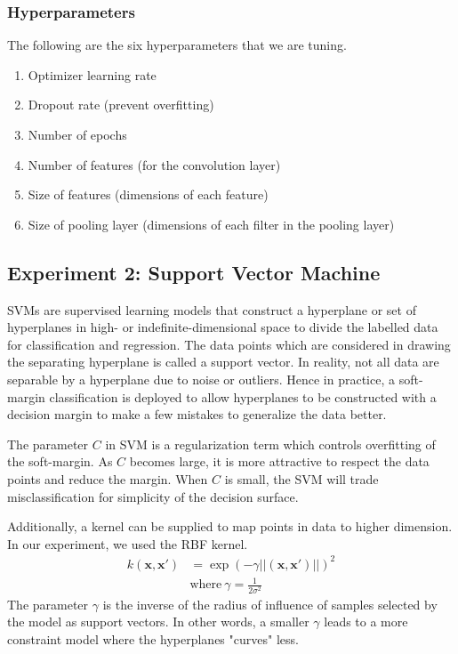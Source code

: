\documentclass[letterpaper]{article}
\begin{document}
\subsubsection{Hyperparameters}
The following are the six hyperparameters that we are tuning.

\begin{enumerate}

    \item Optimizer learning rate
    \item Dropout rate (prevent overfitting)
    \item Number of epochs
    \item Number of features (for the convolution layer)
    \item Size of features (dimensions of each feature)
    \item Size of pooling layer (dimensions of each filter in the pooling layer)

\end{enumerate}

\subsection{Experiment 2: Support Vector Machine}
SVMs are supervised learning models that construct a hyperplane or set of hyperplanes in high-
or indefinite-dimensional space to divide the labelled data for classification and regression.
The data points which are considered in drawing the separating hyperplane is called a support
vector. In reality, not all data are separable by a hyperplane due to noise or outliers. Hence in
practice, a soft-margin classification is deployed to allow hyperplanes to be constructed
with a decision margin to make a few mistakes to generalize the data better.

The parameter $\textit{C}$ in SVM is a regularization term which controls overfitting of the soft-margin.
As $\textit{C}$ becomes large, it is more attractive to respect the data points and reduce
the margin. When $\textit{C}$ is small, the SVM will trade misclassification for simplicity
of the decision surface.

Additionally, a kernel can be supplied to map points in data to higher dimension. In our
experiment, we used the RBF kernel.
\begin{align*}
k (\textbf{x},\textbf{x}') &= \exp(-\gamma||(\textbf{x},\textbf{x}')||)^2 \\
&\text{where} \ \gamma = \frac{1}{2\sigma^2}
\end{align*}
The parameter $\gamma$ is the inverse of the radius of influence of samples selected by the
model as support vectors. In other words, a smaller $\gamma$ leads to a more constraint
model where the hyperplanes "curves" less.
\end{document}
